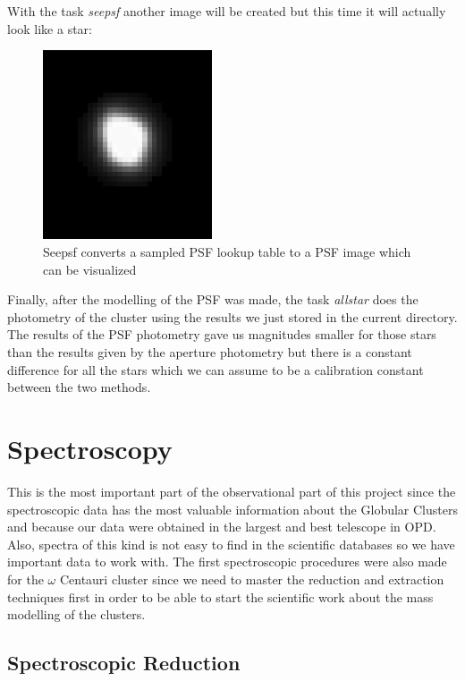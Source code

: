 With the task \textit{seepsf} another image will be created but this time it will actually look like a star:

\begin{figure}[H]
\centering
\includegraphics[width=5cm]{images/psf3.png}
\caption[PSF image created by the task Seepsf]{Seepsf converts a sampled PSF lookup table to a PSF image which can be visualized}
\end{figure}

Finally, after the modelling of the PSF was made, the task \textit{allstar} does the photometry of the cluster using the results we just stored in the current directory. The results of the PSF photometry gave us magnitudes smaller for those stars than the results given by the aperture photometry but there is a constant difference for all the stars which we can assume to be a calibration constant between the two methods. 

\section{Spectroscopy}

This is the most important part of the observational part of this project since the spectroscopic data has the most valuable information about the Globular Clusters and because our data were obtained in the largest and best telescope in OPD. Also, spectra of this kind is not easy to find in the scientific databases so we have important data to work with. The first spectroscopic procedures were also made for the $ \omega $ Centauri cluster since we need to master the reduction and extraction techniques first in order to be able to start the scientific work about the mass modelling of the clusters.

\subsection{Spectroscopic Reduction}

